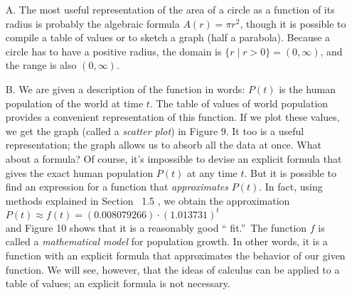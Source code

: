\documentclass{sebase}
\begin{document}
\begin{enumerate}
\item[A.] The most useful representation of the area of a circle as a
function of its radius is probably the algebraic formula $A(r)=\pi r^{2}$,
though it is possible to compile a table of values or to sketch a graph
(half a parabola). Because a circle has to have a positive radius, the
domain is $\{r\mid r>0\}=(0,\infty )$, and the range is also $(0,\infty )$.

\item[B.] 
We are given a description of the function in words: $P(t)$
is the human population of the world at time $t$. The table of values of
world population provides a convenient representation of this function. If
we plot these values, we get the graph (called a \textit{scatter plot}) in
Figure 9. It too is a useful representation; the graph allows us to absorb
all the data at once. What about a formula? Of course, it's impossible to
devise an explicit formula that gives the exact human population $P(t)$ at
any time $t$. But it is possible to find an expression for a function that 
\textit{approximates} $P(t)$. In fact, using methods explained in Section~%
\ifnum{} 1.5\fi%
, we obtain the approximation\\[6pt]
\hspace*{\fill}$P(t)\approx f(t)=(0.008079266)\cdot (1.013731)^{t}$\hspace*{%
\fill}\\[6pt]
and Figure 10 shows that it is a reasonably good \textquotedblleft
fit.\textquotedblright\ The function $f$ is called a \textit{mathematical
model} for population growth. In other words, it is a function with an
explicit formula that approximates the behavior of our given function. We
will see, however, that the ideas of calculus can be applied to a table of
values; an explicit formula is not necessary.


\end{enumerate}
\end{document}
